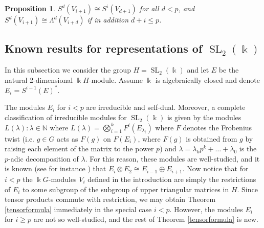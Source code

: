 \documentclass[a4paper]{amsart}
\newcommand{\kk}{\Bbbk}
\def\SL{\operatorname{SL}}
\def\SL2{\operatorname{SL}_{2}(\kk)}
\def\SL{\operatorname{SL}}
\def\N{\mathbb{N}}
\newtheorem{Proposition}[Lemma]{Proposition}
\theoremstyle{definition}
\theoremstyle{remark}
\theoremstyle{Acknowledgments}
\begin{document}
\begin{Proposition}\label{symmetryexterior} $S^d(V_{i+1}) \cong S^i(V_{d+1})$ for all $d < p$, and $S^d(V_{i+1})  \cong \Lambda^d(V_{i+d})$ if in addition $d+i \leq p$.
\end{Proposition}  

\subsection{Known results for representations of $\SL_2(\kk)$}

In this subsection we consider the group $H = \SL_2(\kk)$ and let $E$ be the natural 2-dimensional $\kk H$-module. Assume $\kk$ is algebraically closed and denote $E_i = S^{i-1}(E)^*$. 

The modules $E_i$ for $i<p$ are irreducible and self-dual. Moreover, a complete classification of irreducible modules for $\SL_2(\kk)$ is given by the modules $L(\lambda): \lambda \in \N$ where $L(\lambda) = \bigotimes_{i=1}^k F^i(E_{\lambda_i})$ where $F$ denotes the Frobenius twist (i.e. $g \in G$ acts as $F(g)$ on
$F(E_i)$, where $F(g)$ is obtained from $g$ by raising each element of the matrix to the power $p$) and $\lambda = \lambda_k p^k + \ldots + \lambda_0$ is the $p$-adic decomposition of $\lambda$. For this reason, these modules are well-studied, and it is known (see for instance \cite[Theorem~3.1]{DotyHenke}) that $E_i \otimes E_2 \cong E_{i-1} \oplus E_{i+1}$. Now notice that for $i < p$ the $\kk G$-modules $V_i$ defined in the introduction are simply the restrictions of $E_i$ to some subgroup of the subgroup of upper triangular matrices in $H$. Since tensor products commute with restriction, we may obtain Theorem \ref{tensorformula} immediately in the special case $i<p$. However, the modules $E_i$ for $i \geq p$ are not so well-studied, and the rest of Theorem \ref{tensorformula} is new.
\end{document}
